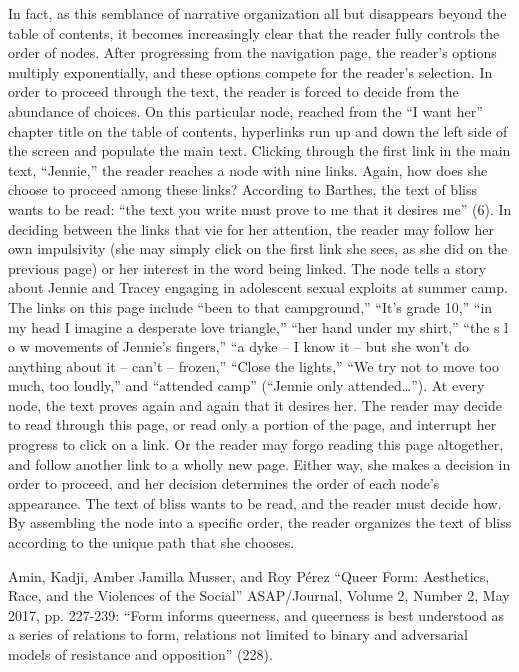 \documentclass[11pt]{article}
\begin{document}
In fact, as this semblance of narrative organization all but
disappears beyond the table of contents, it becomes increasingly clear
that the reader fully controls the order of nodes. After progressing
from the navigation page, the reader’s options multiply exponentially,
and these options compete for the reader’s selection. In order to
proceed through the text, the reader is forced to decide from the
abundance of choices. On this particular node, reached from the “I
want her” chapter title on the table of contents, hyperlinks run up
and down the left side of the screen and populate the main
text. Clicking through the first link in the main text, “Jennie,” the
reader reaches a node with nine links. Again, how does she choose to
proceed among these links? According to Barthes, the text of bliss
wants to be read: “the text you write must prove to me that it desires
me” (6). In deciding between the links that vie for her attention, the
reader may follow her own impulsivity (she may simply click on the
first link she sees, as she did on the previous page) or her interest
in the word being linked. The node tells a story about Jennie and
Tracey engaging in adolescent sexual exploits at summer camp. The
links on this page include “been to that campground,” “It's grade 10,”
“in my head I imagine a desperate love triangle,” “her hand under my
shirt,” “the s l o w movements of Jennie's fingers,” “a dyke -- I know
it -- but she won't do anything about it -- can't -- frozen,” “Close
the lights,” “We try not to move too much, too loudly,” and “attended
camp” (“Jennie only attended…”). At every node, the text proves again
and again that it desires her. The reader may decide to read through
this page, or read only a portion of the page, and interrupt her
progress to click on a link. Or the reader may forgo reading this page
altogether, and follow another link to a wholly new page. Either way,
she makes a decision in order to proceed, and her decision determines
the order of each node’s appearance. The text of bliss wants to be
read, and the reader must decide how. By assembling the node into a
specific order, the reader organizes the text of bliss according to
the unique path that she chooses.


Amin, Kadji, Amber Jamilla Musser, and Roy Pérez “Queer Form:
Aesthetics, Race, and the Violences of the Social” ASAP/Journal,
Volume 2, Number 2, May 2017, pp. 227-239: “Form informs queerness,
and queerness is best understood as a series of relations to form,
relations not limited to binary and adversarial models of resistance
and opposition” (228).
\end{document}
